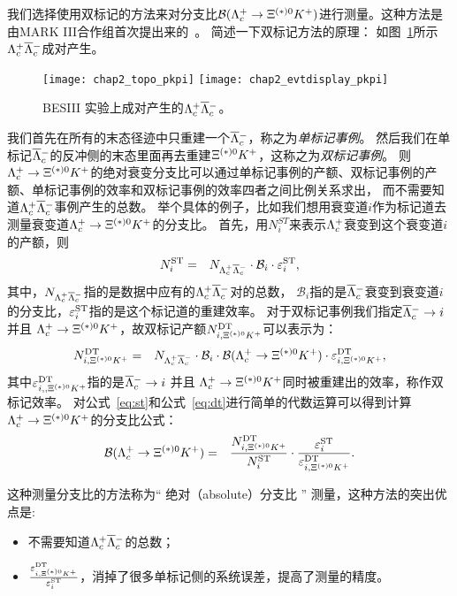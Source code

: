 我们选择使用双标记的方法来对分支比$\mathcal{B}(\Lambda_{c}^{+}\rightarrow \Xi^{(*)0}K^{+})$进行测量。这种方法是由MARK III合作组首次提出来的~\cite{mark3a,mark3b}。
简述一下双标记方法的原理：
如图~\ref{fig:topopkpi}所示$\Lambda_{c}^{+}\overline{\Lambda}{}_{c}^{-}$成对产生。
\begin{figure*}[h]
\centering
\texttt{[image: chap2\_topo\_pkpi]}
\texttt{[image: chap2\_evtdisplay\_pkpi]}
\caption{ BESIII 实验上成对产生的$\Lambda_{c}^{+}\overline{\Lambda}{}_{c}^{-}$。 }
\label{fig:topopkpi}
\end{figure*}
我们首先在所有的末态径迹中只重建一个$\overline{\Lambda}{}_{c}^{-}$，称之为{\it 单标记事例}。
然后我们在单标记$\overline{\Lambda}{}_{c}^{-}$的反冲侧的末态里面再去重建$\Xi^{(*)0}K^{+}$，这称之为{\it 双标记事例}。
则$\Lambda_{c}^{+}\rightarrow \Xi^{(*)0}K^{+}$的绝对衰变分支比可以通过单标记事例的产额、双标记事例的产额、单标记事例的效率和双标记事例的效率四者之间比例关系求出，
而不需要知道$\Lambda_{c}^{+}\overline{\Lambda}{}_{c}^{-}$事例产生的总数。
举个具体的例子，比如我们想用衰变道$i$作为标记道去测量衰变道$\Lambda_{c}^{+}\rightarrow \Xi^{(*)0}K^{+}$的分支比。
首先，用$N_{i}^{ST}$来表示$\Lambda_{c}^{+}$衰变到这个衰变道$i$的产额，则
\begin{eqnarray}
N_{i}^{\rm ST}&=&N_{\Lambda_{c}^{+}\overline{\Lambda}{}_{c}^{-}}\cdot\mathcal{B}_{i}\cdot\varepsilon_{i}^{\rm ST},
\label{eq:st}
\end{eqnarray}
其中，$N_{\Lambda_{c}^{+}\overline{\Lambda}{}_{c}^{-}}$指的是数据中应有的$\Lambda_{c}^{+}\overline{\Lambda}{}_{c}^{-}$对的总数，
 $\mathcal{B}_{i}$指的是$\overline{\Lambda}{}_{c}^{-}$衰变到衰变道$i$的分支比，$\varepsilon_{i}^{\rm ST}$指的是这个标记道的重建效率。
对于双标记事例我们指定$\overline{\Lambda}{}_{c}^{-} \rightarrow i$ 并且 $\Lambda_{c}^{+}\rightarrow \Xi^{(*)0}K^{+}$，故双标记产额$N_{i,\Xi^{(*)0}K^{+}}^{\rm DT}$可以表示为：
\begin{eqnarray}
N_{i,\Xi^{(*)0}K^{+}}^{\rm DT}&=&N_{\Lambda_{c}^{+}\overline{\Lambda}{}_{c}^{-}}\cdot\mathcal{B}_{i}\cdot\mathcal{B}(\Lambda_{c}^{+}\rightarrow \Xi^{(*)0}K^{+})\cdot\varepsilon_{i,\Xi^{(*)0}K^{+}}^{\rm DT},
\label{eq:dt}
\end{eqnarray}
其中$\varepsilon_{i,,\Xi^{(*)0}K^{+}}^{\rm DT}$指的是$\overline{\Lambda}{}_{c}^{-} \rightarrow i$ 并且 $\Lambda_{c}^{+}\rightarrow \Xi^{(*)0}K^{+}$同时被重建出的效率，称作双标记效率。
对公式~\ref{eq:st}和公式~\ref{eq:dt}进行简单的代数运算可以得到计算$\Lambda_{c}^{+}\rightarrow \Xi^{(*)0}K^{+}$的分支比公式：
\begin{eqnarray}
\mathcal{B}(\Lambda_{c}^{+}\rightarrow \Xi^{(*)0}K^{+}) &=& \frac{N_{i,\Xi^{(*)0}K^{+}}^{\rm DT}}{N_{i}^{\rm ST}}\cdot\frac{\varepsilon_{i}^{\rm ST}}{\varepsilon_{i,\Xi^{(*)0}K^{+}}^{\rm DT}}.
\label{eq:ratio}
\end{eqnarray}

这种测量分支比的方法称为“ 绝对（absolute）分支比 ” 测量，这种方法的突出优点是:
\begin{itemize}
  \item 不需要知道$\Lambda_{c}^{+}\overline{\Lambda}{}_{c}^{-}$的总数；
  \item $\frac{\varepsilon_{i,\Xi^{(*)0}K^{+}}^{\rm DT}}{\varepsilon_{i}^{\rm ST}}$，消掉了很多单标记侧的系统误差，提高了测量的精度。
\end{itemize}

